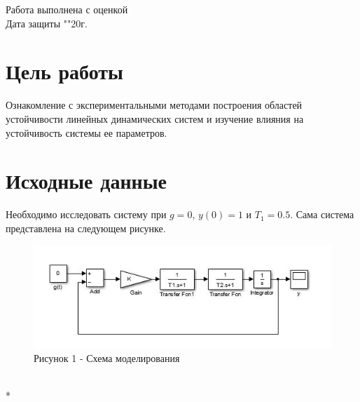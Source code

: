\documentclass[a4paper, 12pt]{article}
\begin{document}
\begin{titlepage}
	Работа выполнена с оценкой \hspace{1cm} \underline{\hspace{8cm}} \\ 
	\vspace{1cm}
	Дата защиты "\underline{\hspace{0.7cm}}"\hspace{0.2cm}\underline{\hspace{2cm}}\hspace{0.2cm}20\underline{\hspace{0.7cm}}г.
	
\end{titlepage}	


\section*{\centering Цель работы}\hfill\par
Ознакомление с экспериментальными методами построения областей устойчивости линейных динамических систем и изучение влияния на устойчивость системы ее параметров.

\section*{\centering Исходные данные}\hfill\par Необходимо исследовать систему при $g = 0$, $y(0) = 1$ и $T_1 = 0.5$. Сама система представлена на следующем рисунке.
\begin{figure}[h]
    \centering
    \includegraphics[width = 0.8\linewidth]{sxema} \\
   \centering Рисунок 1 - Схема моделирования
\end{figure}
\hfill\\*
\newpage
\end{document}
